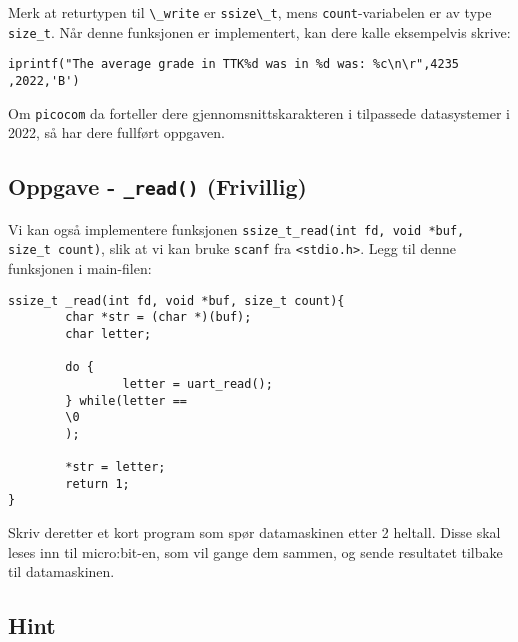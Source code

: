Merk at returtypen til \lstinline{\_write} er \lstinline{ssize\_t}, mens \verb|count|-variabelen er av type \verb|size_t|. Når denne funksjonen er implementert, kan dere kalle eksempelvis skrive:




\verb|iprintf("The average grade in TTK%d was in %d was: %c\n\r",4235|\newline
\verb|,2022,'B')|

Om \verb|picocom| da forteller dere gjennomsnittskarakteren i tilpassede datasystemer i 2022, så har dere fullført oppgaven.




\cprotect\subsection{Oppgave - \lstinline{_read()} (Frivillig)}

Vi kan også implementere funksjonen \lstinline{ssize_t_read(int fd, void *buf, size_t count)}, slik at vi kan bruke \verb|scanf| fra \verb|<stdio.h>|. Legg til denne funksjonen i main-filen:


\begin{lstlisting}
ssize_t _read(int fd, void *buf, size_t count){
        char *str = (char *)(buf);
        char letter;
        
        do {
                letter = uart_read();
        } while(letter == 
        \0
        );
        
        *str = letter;
        return 1;
}
\end{lstlisting}

Skriv deretter et kort program som spør datamaskinen etter 2 heltall. Disse
skal leses inn til micro:bit-en, som vil gange dem sammen, og sende resultatet
tilbake til datamaskinen.

\subsection{Hint}\label{subsec:UART-hint}

